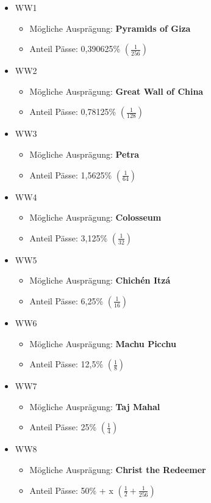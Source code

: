 \begin{NFT-Prop}
\begin{itemize}
    \item WW1
    \begin{itemize}
    	\item Mögliche Ausprägung: \textbf{Pyramids of Giza}
    	\item Anteil Pässe: 0,390625\% $\left( \frac{1}{256} \right)$
    \end{itemize}
    \item WW2
    \begin{itemize}
    	\item Mögliche Ausprägung: \textbf{Great Wall of China}
    	\item Anteil Pässe: 0,78125\% $\left( \frac{1}{128} \right)$
    \end{itemize}
    \item WW3
    \begin{itemize}
    	\item Mögliche Ausprägung: \textbf{Petra} 
    	\item Anteil Pässe: 1,5625\% $\left( \frac{1}{64} \right)$
    \end{itemize}
    \item WW4
    \begin{itemize}
    	\item Mögliche Ausprägung: \textbf{Colosseum} 
    	\item Anteil Pässe: 3,125\% $\left( \frac{1}{32} \right)$
    \end{itemize}
    \item WW5
    \begin{itemize}
    	\item Mögliche Ausprägung: \textbf{Chichén Itzá} 
    	\item Anteil Pässe: 6,25\% $\left( \frac{1}{16} \right)$
    \end{itemize}
    \item WW6
    \begin{itemize}
    	\item Mögliche Ausprägung: \textbf{Machu Picchu} 
    	\item Anteil Pässe: 12,5\% $\left( \frac{1}{8} \right)$
    \end{itemize}
    \item WW7
    \begin{itemize}
    	\item Mögliche Ausprägung: \textbf{Taj Mahal} 
    	\item Anteil Pässe: 25\% $\left( \frac{1}{4} \right)$
    \end{itemize}
    \item WW8
    \begin{itemize}
    	\item Mögliche Ausprägung: \textbf{Christ the Redeemer} 
    	\item Anteil Pässe: 50\% + x $\left( \frac{1}{2} + \frac{1}{256} \right)$
    \end{itemize}
\end{itemize}

\end{NFT-Prop}

